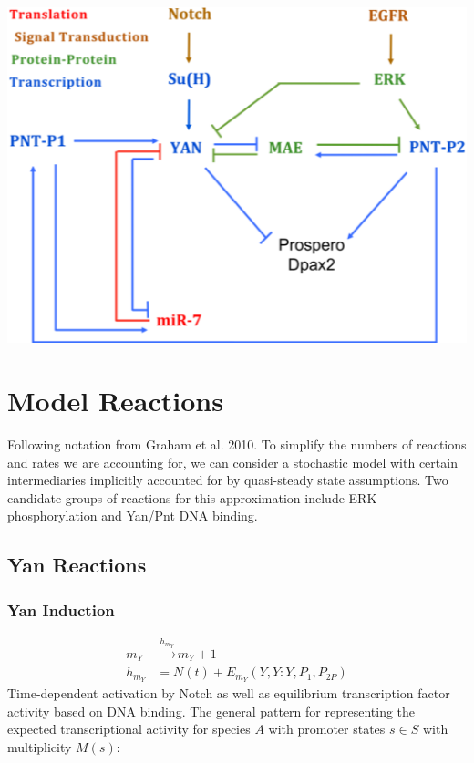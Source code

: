 \documentclass[12pt]{article}
\renewcommand{\(}{\left(}
\renewcommand{\)}{\right)}
\begin{document}
\begin{center}
	\includegraphics[scale=1.0]{model schematic}
\end{center}

\section{Model Reactions}

Following notation from Graham et al. 2010. To simplify the numbers of reactions and rates we are accounting for, we can consider a stochastic model with certain intermediaries implicitly accounted for by quasi-steady state assumptions. Two candidate groups of reactions for this approximation include ERK phosphorylation and Yan/Pnt DNA binding.

\subsection{Yan Reactions}

	\subsubsection{Yan Induction}
	\begin{align}
		m_Y &\xrightarrow{h_{m_Y}} m_Y + 1 \\
		h_{m_Y} &= N(t) + E_{m_Y}(Y,Y:Y,P_1,P_{2P}) \nonumber
	\end{align}
	Time-dependent activation by Notch as well as equilibrium transcription factor activity based on DNA binding. The general pattern for representing the expected transcriptional activity for species $A$ with promoter states $s \in S$ with multiplicity $M(s)$:
	
\end{document}

